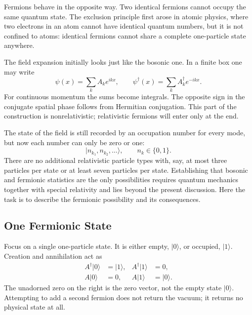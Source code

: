 Fermions behave in the opposite way. Two identical fermions cannot occupy the same quantum state. The exclusion principle first arose in atomic physics, where two electrons in an atom cannot have identical quantum numbers, but it is not confined to atoms: identical fermions cannot share a complete one-particle state anywhere.

The field expansion initially looks just like the bosonic one. In a finite box one may write
\begin{equation}
\psi(x)=\sum_k A_k e^{ikx},
\qquad
\psi^\dagger(x)=\sum_k A_k^\dagger e^{-ikx}.
\end{equation}
For continuous momentum the sums become integrals. The opposite sign in the conjugate spatial phase follows from Hermitian conjugation. This part of the construction is nonrelativistic; relativistic fermions will enter only at the end.

The state of the field is still recorded by an occupation number for every mode, but now each number can only be zero or one:
\begin{equation}
|n_{k_1},n_{k_2},\ldots\rangle,
\qquad n_k\in\{0,1\}.
\end{equation}
There are no additional relativistic particle types with, say, at most three particles per state or at least seven particles per state. Establishing that bosonic and fermionic statistics are the only possibilities requires quantum mechanics together with special relativity and lies beyond the present discussion. Here the task is to describe the fermionic possibility and its consequences.

\subsection{One Fermionic State}

Focus on a single one-particle state. It is either empty, \(|0\rangle\), or occupied, \(|1\rangle\). Creation and annihilation act as
\begin{align}
A^\dagger|0\rangle&=|1\rangle,
&
A^\dagger|1\rangle&=0,
\\
A|0\rangle&=0,
&
A|1\rangle&=|0\rangle.
\end{align}
The unadorned zero on the right is the zero vector, not the empty state \(|0\rangle\). Attempting to add a second fermion does not return the vacuum; it returns no physical state at all.

\begin{classroomqa}
\end{classroomqa}

